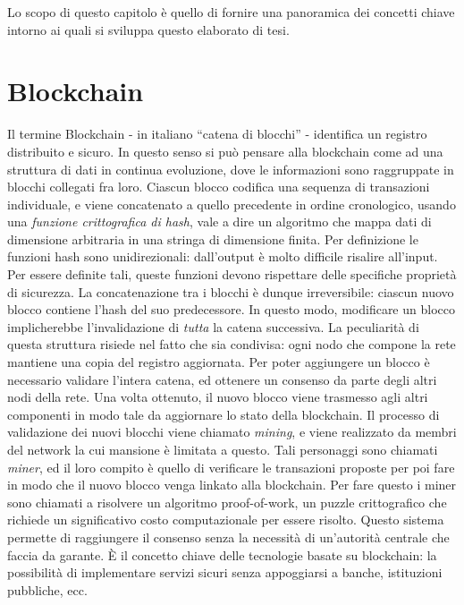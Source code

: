 
Lo scopo di questo capitolo è quello di fornire una panoramica dei concetti chiave intorno ai quali si sviluppa questo elaborato di tesi.

\section{Blockchain}

Il termine Blockchain - in italiano ``catena di blocchi'' - identifica un registro distribuito e sicuro. In questo senso si può pensare alla blockchain come ad una struttura di dati in continua evoluzione, dove le informazioni sono raggruppate in blocchi collegati fra loro.\newline
\indent Ciascun blocco codifica una sequenza di transazioni individuale, e viene concatenato a quello precedente in ordine cronologico, usando una \textit{funzione crittografica di hash}, vale a dire un algoritmo che mappa dati di dimensione arbitraria in una stringa di dimensione finita. Per definizione le funzioni hash sono unidirezionali: dall'output è molto difficile risalire all'input. Per essere definite tali, queste funzioni devono rispettare delle specifiche proprietà di sicurezza.
La concatenazione tra i blocchi è dunque irreversibile: ciascun nuovo blocco contiene l'hash del suo predecessore. In questo modo, modificare un blocco implicherebbe l'invalidazione di \emph{tutta} la catena successiva.\newline  
\indent La peculiarità di questa struttura risiede nel fatto che sia condivisa: ogni nodo che compone la rete mantiene una copia del registro aggiornata. Per poter aggiungere un blocco è necessario validare l'intera catena, ed ottenere un consenso da parte degli altri nodi della rete. Una volta ottenuto, il nuovo blocco viene trasmesso agli altri componenti in modo tale da aggiornare lo stato della blockchain.\newline
\indent Il processo di validazione dei nuovi blocchi viene chiamato \textit{mining}, e viene realizzato da membri del network la cui mansione è limitata a questo. Tali personaggi sono chiamati \textit{miner}, ed il loro compito è quello di verificare le transazioni proposte per poi fare in modo che il nuovo blocco venga linkato alla blockchain. Per fare questo i miner sono chiamati a risolvere un algoritmo proof-of-work, un puzzle crittografico che richiede un significativo costo computazionale per essere risolto.\newline
\indent Questo sistema permette di raggiungere il consenso senza la necessità di un'autorità centrale che faccia da garante. \`E il concetto chiave delle tecnologie basate su blockchain: la possibilità di implementare servizi sicuri senza appoggiarsi a banche, istituzioni pubbliche, ecc.\newline
